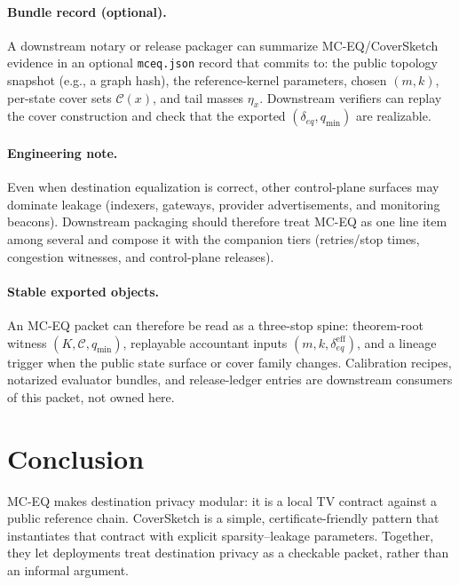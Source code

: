 \documentclass[11pt]{article}
\begin{document}
\paragraph{Bundle record (optional).}
A downstream notary or release packager can summarize MC-EQ/CoverSketch evidence in an optional \texttt{mceq.json} record that commits to:
the public topology snapshot (e.g., a graph hash), the reference-kernel parameters, chosen $(m,k)$, per-state cover sets $\mathcal{C}(x)$, and tail masses $\eta_x$.
Downstream verifiers can replay the cover construction and check that the exported $(\delta_{eq},q_{\min})$ are realizable.

\paragraph{Engineering note.}
Even when destination equalization is correct, other control-plane surfaces may dominate leakage (indexers, gateways, provider advertisements, and monitoring beacons).
Downstream packaging should therefore treat MC-EQ as one line item among several and compose it with the companion tiers (retries/stop times, congestion witnesses, and control-plane releases).\cite{series:traceifaces,series:wcongeq,series:state3}


\paragraph{Stable exported objects.}
An MC-EQ packet can therefore be read as a three-stop spine: theorem-root witness $(K,\mathcal{C},q_{\min})$, replayable accountant inputs $(m,k,\delta_{eq}^{\mathrm{eff}})$, and a lineage trigger when the public state surface or cover family changes. Calibration recipes, notarized evaluator bundles, and release-ledger entries are downstream consumers of this packet, not owned here.\cite{series:eval3,series:eval1,series:release}

\section{Conclusion}
MC-EQ makes destination privacy modular: it is a local TV contract against a public reference chain.
CoverSketch is a simple, certificate-friendly pattern that instantiates that contract with explicit sparsity--leakage parameters.
Together, they let deployments treat destination privacy as a checkable packet, rather than an informal argument.
\end{document}

